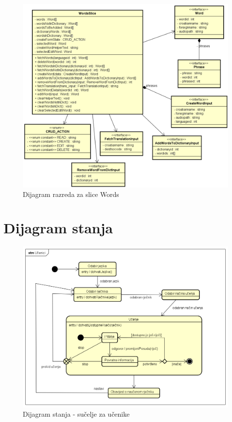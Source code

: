 \begin{figure}[htp]
	\includegraphics[scale=0.5]{dijagrami/WordsSlice.png}
	\centering
	\caption{Dijagram razreda za slice Words}
	\label{fig:cls-words}
\end{figure}

\eject


		\section{Dijagram stanja}
			
			
\begin{figure}[htp]
	\includegraphics[scale=0.5]{dijagrami/state_ucenici.png}
	\centering
	\caption{Dijagram stanja - sučelje za učenike}
	\label{fig:state-ucenici}
\end{figure}

